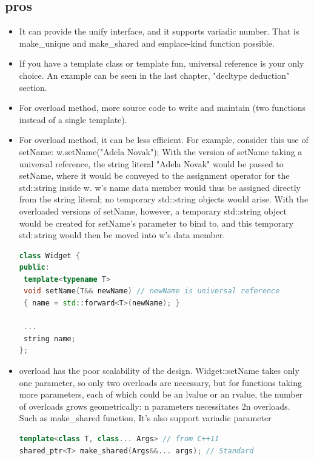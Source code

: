 \documentclass[a4paper,11pt,twoside]{book}
\begin{document}
\subsection{pros}
\begin{itemize}
\item It can provide the unify interface, and it supports variadic number. That is make\_unique and make\_shared and emplace-kind function possible.

\item If you have a template class or template fun, universal reference is your only choice. An example can be seen in the last chapter, "decltype deduction" section.

\item For overload method, more source code to write and maintain (two functions instead of a single template). 

\item For overload method, it can be less efficient. For example, consider this use of setName: w.setName("Adela Novak"); With the version of setName taking a universal reference, the string literal "Adela Novak" would be passed to setName, where it would be conveyed to the assignment operator for the std::string inside w. w's name data member would thus be assigned directly from the string literal; no temporary std::string objects would arise. With the overloaded versions of setName, however, a temporary std::string object
would be created for setName's parameter to bind to, and this temporary std::string would then be moved into w's data member.

\begin{lstlisting}[frame=single, language=c++]
class Widget {
public:
 template<typename T>
 void setName(T&& newName) // newName is universal reference
 { name = std::forward<T>(newName); }
 
 ... 
 string name;    
};

\end{lstlisting}


\item overload has the poor scalability of the design. Widget::setName takes only one parameter, so only two overloads are necessary, but for functions taking more parameters, each of which could be an lvalue or an rvalue, the number of overloads grows geometrically: n parameters necessitates 2n overloads. Such as make\_shared function, It's also support variadic parameter

\begin{lstlisting}[frame=single, language=c++]
template<class T, class... Args> // from C++11
shared_ptr<T> make_shared(Args&&... args); // Standard


\end{lstlisting}
\end{itemize}
\end{document}
